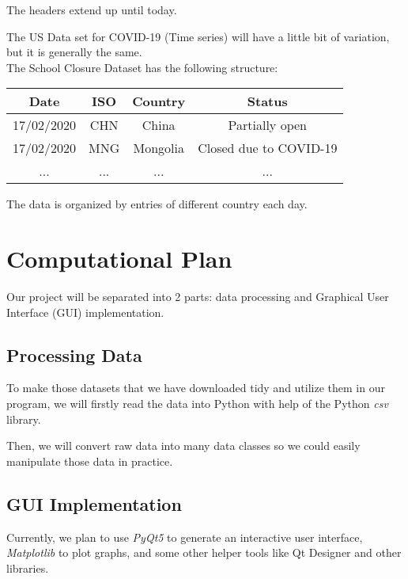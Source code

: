 \documentclass[fontsize=11pt]{article}
\begin{document}
The headers extend up until today.

The US Data set for COVID-19 (Time series) will have a little bit of variation, but it is generally the same.\\

The School Closure Dataset has the following structure:
\begin{center}
    \begin{tabular}{ |c|c|c|c| }
        \hline
        Date & ISO & Country & Status \\
        \hline
        17/02/2020 & CHN & China & Partially open \\
        \hline
        17/02/2020 & MNG & Mongolia & Closed due to COVID-19 \\
        \hline
        ... & ... & ... & ...\\
        \hline
    \end{tabular}
\end{center}

The data is organized by entries of different country each day.

\newpage


\section*{Computational Plan}

Our project will be separated into 2 parts: data processing and Graphical User Interface (GUI) implementation.

\subsection*{Processing Data}

To make those datasets that we have downloaded tidy and utilize them in our program, we will firstly read the data into Python with help of the Python \emph{csv} library.

Then, we will convert raw data into many data classes so we could easily manipulate those data in practice.

\subsection*{GUI Implementation}

Currently, we plan to use \emph{PyQt5} to generate an interactive user interface, \emph{Matplotlib} to plot graphs, and some other helper tools like Qt Designer and other libraries.
\end{document}
